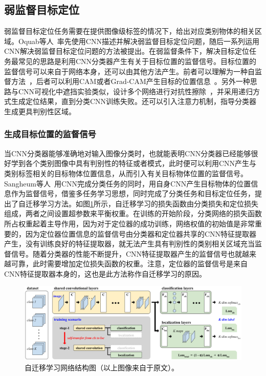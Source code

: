 \subsection{弱监督目标定位}
弱监督目标定位任务需要在提供图像级标签的情况下，给出对应类别物体的相关区域。Oquab等人~\cite{Oquab2015IsOL}率先使用CNN描述并解决弱监督目标定位问题，随后一系列运用CNN解决弱监督目标定位问题的方法被提出。在弱监督条件下，解决目标定位任务最常见的思路是利用CNN分类器产生有关于目标位置的监督信号。目标位置的监督信号可以来自于网络本身，还可以由其他方法产生。前者可以理解为一种自监督方法~\cite{2015Hwang}，后者可以利用CAM或者Grad-CAM产生目标的位置信息~\cite{Kim_2017_ICCV, Krishna2018}。另外一种思路与CNN可视化中遮挡实验类似，设计多个网络进行对抗性擦除~\cite{WeiFLCZY17, ZhangWF0H18}，并采用递归方式生成定位结果，直到分类CNN训练失败。还可以引入注意力机制，指导分类器生成更具判别性区域。

\subsubsection{生成目标位置的监督信号}
当CNN分类器能够准确地对输入图像分类时，也就能表明CNN分类器已经能够很好学到各个类别图像中具有判别性的特征或者模式，此时便可以利用CNN产生与类别标签相关的目标物体位置信息，从而引入有关目标物体位置的监督信号。Sangheum等人~\cite{2015Hwang}用CNN完成分类任务的同时，用自身CNN产生目标物体的位置信息作为监督信号，借鉴多任务学习思想，同时完成了分类任务和目标定位任务，提出了自迁移学习方法。如图\ref{fig:self_transfer_learning}所示，自迁移学习的损失函数由分类损失和定位损失组成，两者之间设置超参数来平衡权重。在训练的开始阶段，分类网络的损失函数所占权重起着主导作用，因为对于定位器的成功训练，网络权值的初始值是非常重要的，因为定位器位置信息的监督信号由分类器和定位器共享的CNN特征提取器产生，没有训练良好的特征提取器，就无法产生具有判别性的类别相关区域充当监督信号。随着分类器的性能不断提升，CNN特征提取器产生的监督信号也就越来越可靠，此时需要增加定位损失函数的权重。注意，定位器的监督信号是来自CNN特征提取器本身的，这也是此方法称作自迁移学习的原因。

\begin{figure}[h]
	\centering
	\includegraphics[width=1.0\textwidth]{figure/self_transfer_learning}
	\caption{自迁移学习网络结构图（以上图像来自于原文）。} 
	\label{fig:self_transfer_learning}
\end{figure}

